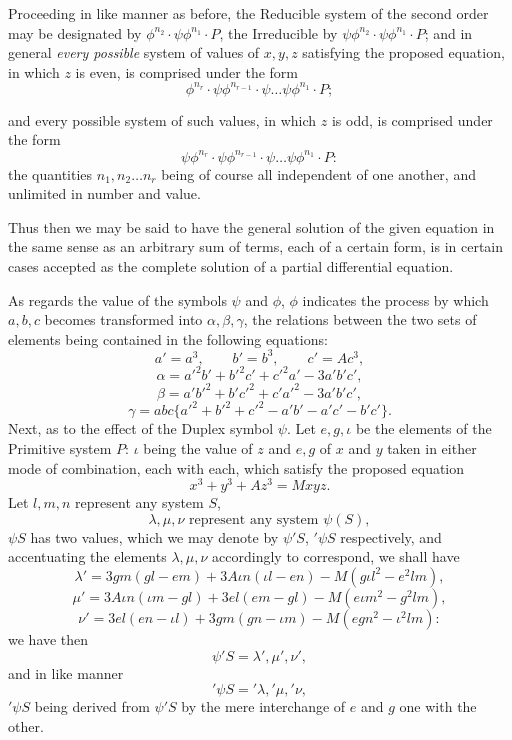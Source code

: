 \documentclass[11pt]{article}
\newcommand{\sourcepage}[1]{\marginpar{\scriptsize p.~#1}}
\begin{document}
Proceeding in like manner as before, the Reducible system of the second order may be designated by $\phi^{n_2}\cdot\psi\phi^{n_1}\cdot P$, the Irreducible by $\psi\phi^{n_2}\cdot\psi\phi^{n_1}\cdot P$; and in general \emph{every possible} system of values of $x,y,z$ satisfying the proposed equation, in which $z$ is even, is comprised under the form
\[
\phi^{n_r}\cdot\psi\phi^{n_{r-1}}\cdot\psi\ldots\psi\phi^{n_1}\cdot P;
\]

\sourcepage{116}
and every possible system of such values, in which $z$ is odd, is comprised under the form
\[
\psi\phi^{n_r}\cdot\psi\phi^{n_{r-1}}\cdot\psi\ldots\psi\phi^{n_1}\cdot P:
\]
the quantities $n_1,n_2\ldots n_r$ being of course all independent of one another, and unlimited in number and value.

Thus then we may be said to have the general solution of the given equation in the same sense as an arbitrary sum of terms, each of a certain form, is in certain cases accepted as the complete solution of a partial differential equation.

As regards the value of the symbols $\psi$ and $\phi$, $\phi$ indicates the process by which $a,b,c$ becomes transformed into $\alpha,\beta,\gamma$, the relations between the two sets of elements being contained in the following equations:
\[
a'=a^3,\qquad b'=b^3,\qquad c'=Ac^3,
\]
\[
\alpha=a'^2b'+b'^2c'+c'^2a'-3a'b'c',
\]
\[
\beta=a'b'^2+b'c'^2+c'a'^2-3a'b'c',
\]
\[
\gamma=abc\{a'^2+b'^2+c'^2-a'b'-a'c'-b'c'\}.
\]
Next, as to the effect of the Duplex symbol $\psi$. Let $e,g,\iota$ be the elements of the Primitive system $P$: $\iota$ being the value of $z$ and $e,g$ of $x$ and $y$ taken in either mode of combination, each with each, which satisfy the proposed equation
\[
x^3+y^3+Az^3=Mxyz.
\]
Let $l,m,n$ represent any system $S$,
\[
\lambda,\mu,\nu\text{ represent any system }\psi(S),
\]
$\psi S$ has two values, which we may denote by $\psi'S$, ${}'\!\psi S$ respectively, and accentuating the elements $\lambda,\mu,\nu$ accordingly to correspond, we shall have
\[
\lambda'=3gm(gl-em)+3A\iota n(\iota l-en)-M(g\iota l^2-e^2lm),
\]
\[
\mu'=3A\iota n(\iota m-gl)+3el(em-gl)-M(e\iota m^2-g^2lm),
\]
\[
\nu'=3el(en-\iota l)+3gm(gn-\iota m)-M(egn^2-\iota^2lm):
\]
we have then
\[
\psi'S=\lambda',\mu',\nu',
\]
and in like manner
\[
{}'\!\psi S={} '\!\lambda,{} '\!\mu,{} '\!\nu,
\]
${}'\!\psi S$ being derived from $\psi'S$ by the mere interchange of $e$ and $g$ one with the other.
\end{document}
